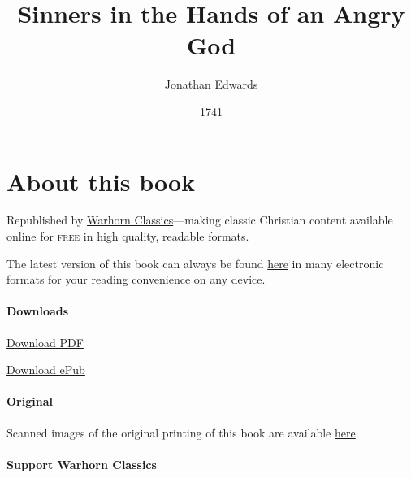 \documentclass[
]{book}
\title{Sinners in the Hands of an Angry God}
\author{Jonathan Edwards}
\date{1741}
\begin{document}
\maketitle

\mainmatter
{}

{
\setcounter{tocdepth}{1}
\tableofcontents
}
\hypertarget{about-this-book}{%
\chapter*{About this book}\label{about-this-book}}

Republished by \href{https://classics.warhornmedia.com/}{Warhorn Classics}---making classic Christian content available online for \textsc{free} in high quality, readable formats.

The latest version of this book can always be found \href{https://warhornmedia.github.io/edwards-sinners-angry-god/}{here} in many electronic formats for your reading convenience on any device.

\hypertarget{downloads}{%
\subsubsection*{Downloads}\label{downloads}}

\href{https://warhornmedia.github.io/edwards-sinners-angry-god//Edwards-Sinners_In_the-Hands_of_an_Angry_God.pdf}{Download PDF}

\href{https://warhornmedia.github.io/edwards-sinners-angry-god//Edwards-Sinners_In_the-Hands_of_an_Angry_God.epub}{Download ePub}

\hypertarget{original}{%
\subsubsection*{Original}\label{original}}

Scanned images of the original printing of this book are available \href{https://digitalcommons.unl.edu/cgi/viewcontent.cgi?referer=https://en.wikipedia.org/\&httpsredir=1\&article=1053\&context=etas}{here}.

\hypertarget{support-warhorn-classics}{%
\subsubsection*{Support Warhorn Classics}\label{support-warhorn-classics}}
\end{document}
